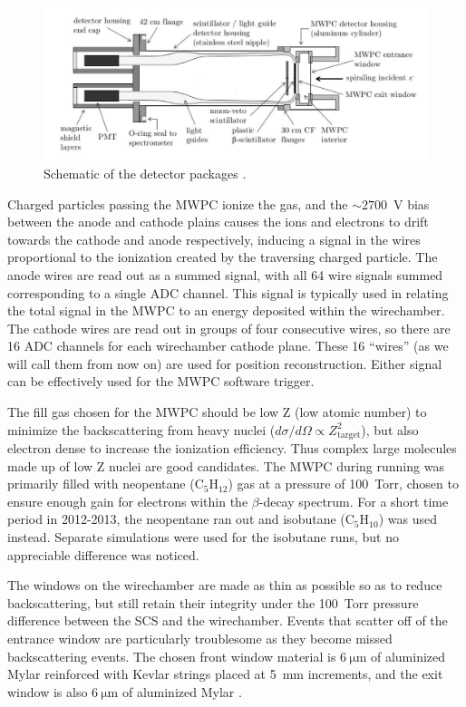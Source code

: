 \begin{figure}[h]
  \centering
  \includegraphics[scale=0.6]{2-UCNAExperiment/detector_setup.pdf} 
  \caption{Schematic of the detector packages \cite{plaster2012}.}
  \label{fig:detectors}
\end{figure}

Charged particles passing the MWPC ionize the gas, and the $\sim2700$~V bias between the anode and
cathode plains causes the ions and electrons to drift towards the cathode and anode respectively,
inducing a signal in the wires proportional to the ionization created by the traversing charged particle.
The anode wires are read out as a summed signal, with all 64 wire signals summed corresponding to
a single ADC channel. This signal is typically used in relating the total signal in the MWPC
to an energy deposited within the wirechamber. The cathode wires are read out in groups of four
consecutive wires, so there are 16 ADC channels for each wirechamber cathode plane. These 16
``wires'' (as we will call them from now on) are used for position reconstruction. Either
signal can be effectively used for the MWPC software trigger.

The fill
gas chosen for the MWPC should be low Z (low atomic number) to minimize the backscattering from heavy nuclei
($d\sigma/d\Omega \propto Z_{\mathrm{target}}^2$),
but also electron dense to increase the ionization efficiency. Thus complex large molecules
made up of low Z nuclei are good candidates.
The MWPC during running was primarily filled with neopentane ($\mathrm{C}_5\mathrm{H}_{12}$) gas at a pressure of
100~Torr, chosen to ensure enough gain for electrons within the $\beta$-decay spectrum. For a
short time period in 2012-2013, the neopentane ran out and isobutane ($\mathrm{C}_5\mathrm{H}_{10}$)
was used instead. Separate simulations were used for the isobutane runs, but no appreciable
difference was noticed.

The windows on the wirechamber are made as thin as possible so as to reduce backscattering, but still
retain their integrity under the 100~Torr pressure difference between the SCS and the wirechamber. Events that
scatter off of the entrance window are particularly troublesome as they become missed backscattering events.
The chosen front window material is $6\mathrm{~\mu{m}}$ of aluminized Mylar reinforced with Kevlar strings
placed at 5~mm increments, and the exit window is also $6\mathrm{~\mu{m}}$ of aluminized Mylar \cite{mpmThesis}. 

